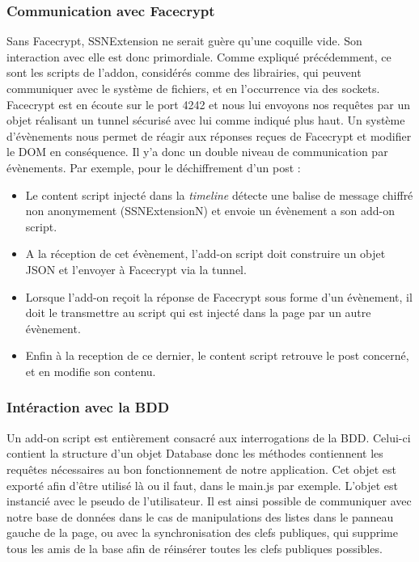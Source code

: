 \documentclass[a4paper,11pt,french]{article}
\begin{document}
\subsubsection{Communication avec Facecrypt}
Sans Facecrypt, SSNExtension ne serait guère qu'une coquille vide. Son interaction
avec elle est donc primordiale. Comme expliqué précédemment, ce sont les scripts de
l'addon, considérés comme des librairies, qui peuvent communiquer avec le système de
fichiers, et en l'occurrence via des sockets. Facecrypt est en écoute sur le port 4242
et nous lui envoyons nos requêtes par un objet réalisant un tunnel sécurisé avec lui
comme indiqué plus haut. Un système d'évènements nous permet de réagir aux réponses
reçues de Facecrypt et modifier le DOM en conséquence. Il y'a donc un double niveau
de communication par évènements. Par exemple, pour le déchiffrement d'un post :
\begin{itemize}
\item Le content script injecté dans la \emph{timeline} détecte une balise de message
chiffré non anonymement (SSNExtensionN) et envoie un évènement a son add-on script.
\item A la réception de cet évènement, l'add-on script doit construire un objet JSON
et l'envoyer à Facecrypt via la tunnel.
\item Lorsque l'add-on reçoit la réponse de Facecrypt sous forme d'un 
évènement, il doit le transmettre au script qui est injecté dans la page par un autre
évènement.
\item Enfin à la reception de ce dernier, le content script retrouve le post concerné,
et en modifie son contenu.
\end{itemize}

\subsubsection{Intéraction avec la BDD}
Un add-on script est entièrement consacré aux interrogations de la BDD. Celui-ci 
contient la structure d'un objet Database donc les méthodes contiennent les requêtes
nécessaires au bon fonctionnement de notre application. Cet objet est exporté afin
d'être utilisé là ou il faut, dans le main.js par exemple. L'objet est instancié 
avec le pseudo de l'utilisateur. Il est ainsi possible de communiquer avec notre base
de données dans le cas de manipulations des listes dans le panneau gauche de la page,
ou avec la synchronisation des clefs publiques, qui supprime tous les amis de la base
afin de réinsérer toutes les clefs publiques possibles.
\end{document}
